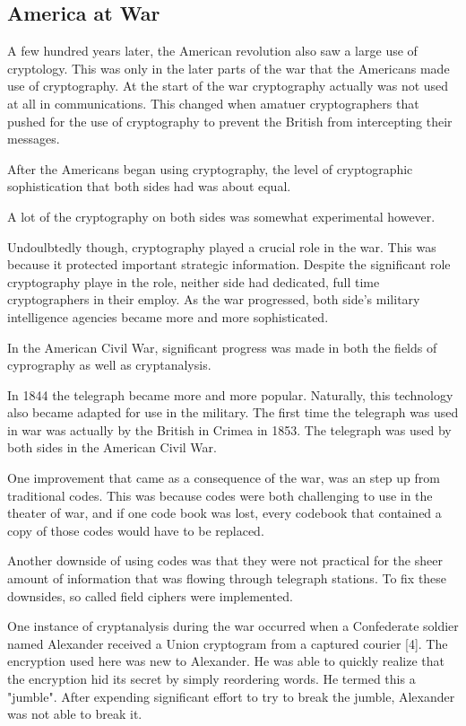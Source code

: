 \documentclass{article}
\begin{document}
    \subsection{America at War} 

    A few hundred years later, the American revolution also saw a large
    use of cryptology. This was only in the later parts of the war
    that the Americans made use of cryptography.
    At the start of the war cryptography actually was not used at all
    in communications. This changed when amatuer cryptographers
    that pushed for the use of cryptography to prevent the British
    from intercepting their messages.

    After the Americans began using cryptography, the level of
    cryptographic sophistication that both sides had was about equal.

    A lot of the cryptography on both sides was somewhat experimental however.

    Undoulbtedly though, cryptography played a crucial role in the war.
    This was because it protected important strategic information.
    Despite the significant role cryptography playe in the role,
    neither side had dedicated, full time cryptographers in their employ.
    As the war progressed, both side's military intelligence agencies
    became more and more sophisticated.

    In the American Civil War, significant progress was made in
    both the fields of cyprography as well as cryptanalysis.

    In 1844 the telegraph became more and more popular. Naturally,
    this technology also became adapted for use in the military.
    The first time the telegraph was used in war was actually by
    the British in Crimea in 1853.
    The telegraph was used by both sides in the American Civil War.

    One improvement that came as a consequence of the war,
    was an step up from traditional codes. This was because
    codes were both challenging to use in the theater of war,
    and if one code book was lost, every codebook that contained
    a copy of those codes would have to be replaced.

    Another downside of using codes was that they were not practical for
    the sheer amount of information that was flowing through telegraph
    stations.
    To fix these downsides, so called field ciphers were implemented.

    One instance of cryptanalysis during the war occurred when a
    Confederate soldier named Alexander received a Union cryptogram
    from a captured courier [4].
    The encryption used here was new to Alexander. He was able
    to quickly realize that the encryption hid its secret by simply
    reordering words. He termed this a "jumble". After expending significant
    effort to try to break the jumble, Alexander was not able to break it.
\end{document}
